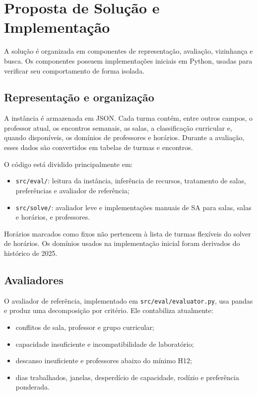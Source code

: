 \section{Proposta de Solução e Implementação}
\label{sec:proposta_solucao}

A solução é organizada em componentes de representação, avaliação, vizinhança e busca. Os componentes possuem implementações iniciais em Python, usadas para verificar seu comportamento de forma isolada. 

\subsection{Representação e organização}
\label{subsec:arquitetura}

A instância é armazenada em JSON. Cada turma contém, entre outros campos, o professor atual, os encontros semanais, as salas, a classificação curricular e, quando disponíveis, os domínios de professores e horários. Durante a avaliação, esses dados são convertidos em tabelas de turmas e encontros.

O código está dividido principalmente em:
\begin{itemize}
    \item \texttt{src/eval/}: leitura da instância, inferência de recursos, tratamento de salas, preferências e avaliador de referência;
    \item \texttt{src/solve/}: avaliador leve e implementações manuais de SA para salas, salas e horários, e professores.
\end{itemize}

Horários marcados como fixos não pertencem à lista de turmas flexíveis do solver de horários. Os domínios usados na implementação inicial foram derivados do histórico de 2025. 

\subsection{Avaliadores}
\label{subsec:avaliador}

O avaliador de referência, implementado em \texttt{src/eval/evaluator.py}, usa pandas e produz uma decomposição por critério. Ele contabiliza atualmente:
\begin{itemize}
    \item conflitos de sala, professor e grupo curricular;
    \item capacidade insuficiente e incompatibilidade de laboratório;
    \item descanso insuficiente e professores abaixo do mínimo H12;
    \item dias trabalhados, janelas, desperdício de capacidade, rodízio e preferência ponderada.
\end{itemize}

